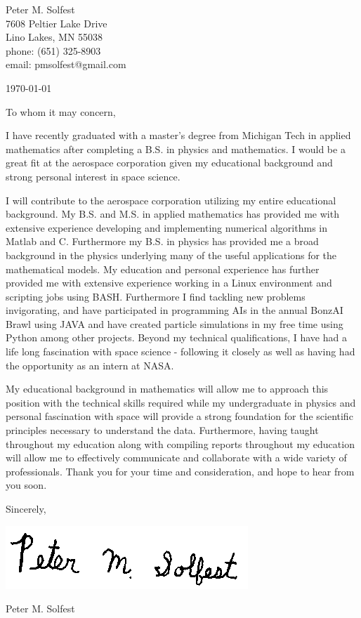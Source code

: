 \documentclass[letterpaper,12pt]{article}
\begin{document}
Peter M. Solfest\\
7608 Peltier Lake Drive\\
Lino Lakes, MN 55038\\
phone: (651) 325-8903\\
email: pmsolfest@gmail.com

\today


To whom it may concern, %

I have recently graduated with a master's degree from Michigan Tech in applied mathematics after
completing a B.S. in physics and mathematics.
I would be a great fit at the aerospace corporation given my educational background
and strong personal interest in space science.

I will contribute to the aerospace corporation utilizing my entire educational background.
My B.S. and M.S. in applied mathematics has provided me with extensive experience developing
and implementing numerical algorithms in Matlab and C.
Furthermore my B.S. in physics has provided me a broad background in the physics
underlying many of the useful applications for the mathematical models.
My education and personal experience has further provided me with
extensive experience working in a Linux environment and scripting
jobs using BASH.
Furthermore I find tackling new problems invigorating, and have
participated in programming AIs in the annual BonzAI Brawl using JAVA and
have created particle simulations in my free time using Python among
other projects.
Beyond my technical qualifications, I have had a life long fascination with
space science - following it closely as well as having had the opportunity
as an intern at NASA.

My educational background in mathematics will allow 
me to approach this position with the technical skills required
while my undergraduate in physics and personal fascination with space
will provide a strong foundation for the scientific principles necessary
to understand the data.
Furthermore, having taught throughout my education along with compiling reports
throughout my education will allow me to effectively communicate and
collaborate with a wide variety of professionals.
Thank you for your time and consideration, and hope to hear from you soon.

Sincerely,

\includegraphics[height=.5in]{signature.png}

Peter M. Solfest
\end{document}
